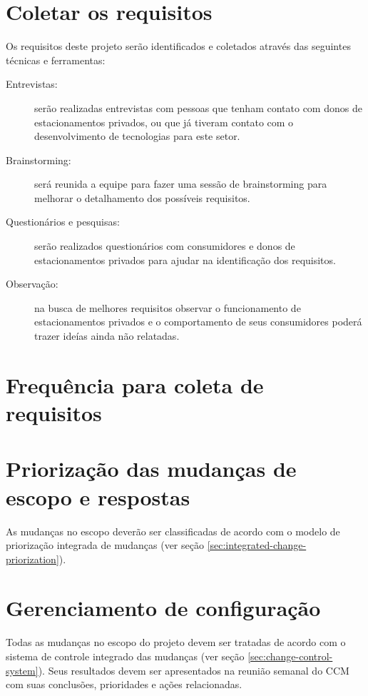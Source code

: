 \section{Coletar os requisitos}

Os requisitos deste projeto serão identificados e coletados através das seguintes técnicas e ferramentas:

\begin{description}
	\item[Entrevistas:] serão realizadas entrevistas com pessoas que tenham contato com donos de estacionamentos privados, ou que já tiveram contato com o desenvolvimento de tecnologias para este setor.
	\item[Brainstorming:] será reunida a equipe para fazer uma sessão de brainstorming para melhorar o detalhamento dos possíveis requisitos.
	\item[Questionários e pesquisas:] serão realizados questionários com consumidores e donos de estacionamentos privados para ajudar na identificação dos requisitos.
	\item[Observação:] na busca de melhores requisitos observar o funcionamento de estacionamentos privados e o comportamento de seus consumidores poderá trazer ideías ainda não relatadas.
\end{description}

\section{Frequência para coleta de requisitos}


\section{Priorização das mudanças de escopo e respostas}

As mudanças no escopo deverão ser classificadas de acordo com o modelo de priorização integrada de mudanças (ver seção \ref{sec:integrated-change-priorization}).

\section{Gerenciamento de configuração}

Todas as mudanças no escopo do projeto devem ser tratadas de acordo com o sistema de controle integrado das mudanças (ver seção \ref{sec:change-control-system}). Seus resultados devem ser apresentados na reunião semanal do CCM com suas conclusões, prioridades e ações relacionadas.

